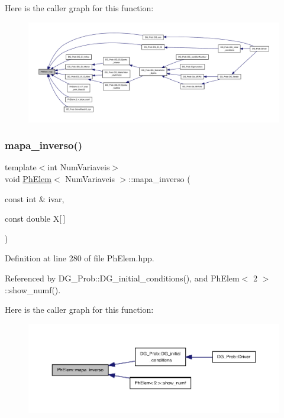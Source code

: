Here is the caller graph for this function\+:
\nopagebreak
\begin{figure}[H]
\begin{center}
\leavevmode
\includegraphics[width=350pt]{classPhElem_a6b7f26c842b4f6b54782c6ddaa4fd6d6_icgraph}
\end{center}
\end{figure}
\mbox{\label{classPhElem_aa53cc9dad058e9dbebfb971bdabe80fc}} 
\subsubsection{\texorpdfstring{mapa\+\_\+inverso()}{mapa\_inverso()}}
{\footnotesize\ttfamily template$<$int Num\+Variaveis$>$ \\
void \hyperlink{classPhElem}{Ph\+Elem}$<$ Num\+Variaveis $>$\+::mapa\+\_\+inverso (\begin{DoxyParamCaption}\item[{const int \&}]{ivar,  }\item[{const double}]{X\mbox{[}$\,$\mbox{]} }\end{DoxyParamCaption})}



Definition at line 280 of file Ph\+Elem.\+hpp.



Referenced by D\+G\+\_\+\+Prob\+::\+D\+G\+\_\+initial\+\_\+conditions(), and Ph\+Elem$<$ 2 $>$\+::show\+\_\+numf().

Here is the caller graph for this function\+:
\nopagebreak
\begin{figure}[H]
\begin{center}
\leavevmode
\includegraphics[width=350pt]{classPhElem_aa53cc9dad058e9dbebfb971bdabe80fc_icgraph}
\end{center}
\end{figure}
\mbox{\label{classPhElem_a857f4ffbef27f0ef054f59eceffbad27}} 
